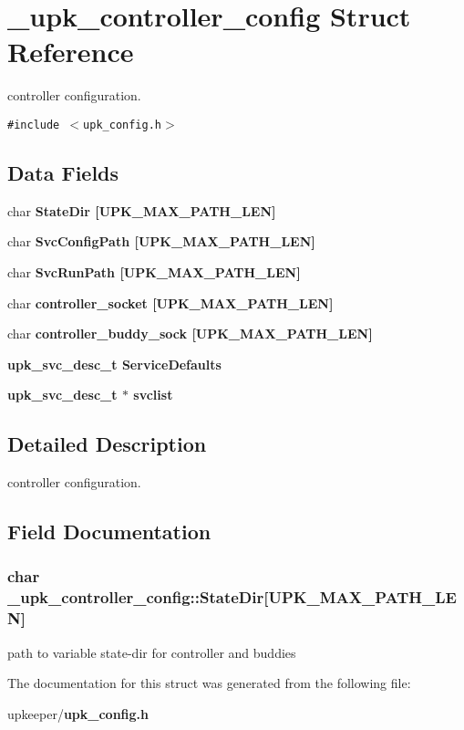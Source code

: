 \section{\_\-upk\_\-controller\_\-config Struct Reference}
\label{struct__upk__controller__config}
controller configuration.  


{\tt \#include $<$upk\_\-config.h$>$}

\subsection*{Data Fields}
\begin{CompactItemize}
\item 
char \bf{State\-Dir} [UPK\_\-MAX\_\-PATH\_\-LEN]
\item 
char \bf{Svc\-Config\-Path} [UPK\_\-MAX\_\-PATH\_\-LEN]
\item 
char \bf{Svc\-Run\-Path} [UPK\_\-MAX\_\-PATH\_\-LEN]
\item 
char \bf{controller\_\-socket} [UPK\_\-MAX\_\-PATH\_\-LEN]
\item 
char \bf{controller\_\-buddy\_\-sock} [UPK\_\-MAX\_\-PATH\_\-LEN]
\item 
\bf{upk\_\-svc\_\-desc\_\-t} \bf{Service\-Defaults}
\item 
\bf{upk\_\-svc\_\-desc\_\-t} $\ast$ \bf{svclist}
\end{CompactItemize}


\subsection{Detailed Description}
controller configuration. 



\subsection{Field Documentation}
\subsubsection{\setlength{\rightskip}{0pt plus 5cm}char \bf{\_\-upk\_\-controller\_\-config::State\-Dir}[UPK\_\-MAX\_\-PATH\_\-LEN]}\label{struct__upk__controller__config_88676c1b0a7d3f81b73e87d44f52031b}


path to variable state-dir for controller and buddies 

The documentation for this struct was generated from the following file:\begin{CompactItemize}
\item 
upkeeper/\bf{upk\_\-config.h}\end{CompactItemize}
